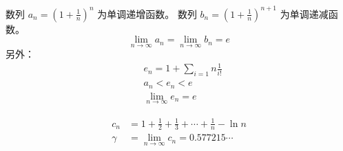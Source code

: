 \begin{exposition}[自然常数 $e$]
    数列 $a_n = (1+\frac{1}{n})^n$ 为单调递增函数。
    数列 $b_n = (1+\frac{1}{n})^{n+1}$ 为单调递减函数。
    \begin{equation}
        \lim_{n \to \infty}{a_n} = \lim_{n \to \infty}{b_n} = e
    \end{equation}
    另外：
    \begin{align*}
        &e_n = 1 + \sum_{i=1}{n}{\frac{1}{i!}} \\
        &a_n < e_n < e \\
        &\lim_{n \to \infty}{e_n} = e
    \end{align*}
\end{exposition}

\begin{exposition}[欧拉常数]
    \begin{align*}
        c_n &= 1 + \frac12 + \frac13 + \cdots + \frac1n - \ln{n}\\
        \gamma &= \lim_{n \to \infty}{c_n} = 0.577215\cdots
    \end{align*}
\end{exposition}

